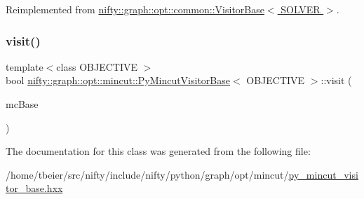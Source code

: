 Reimplemented from \hyperlink{classnifty_1_1graph_1_1opt_1_1common_1_1VisitorBase_a41efc013731cca97176a61be58db0094}{nifty\+::graph\+::opt\+::common\+::\+Visitor\+Base$<$ S\+O\+L\+V\+E\+R $>$}.

\mbox{\label{classnifty_1_1graph_1_1opt_1_1mincut_1_1PyMincutVisitorBase_a40a323a9b5748e162043d516954e940c}} 
\subsubsection{\texorpdfstring{visit()}{visit()}}
{\footnotesize\ttfamily template$<$class O\+B\+J\+E\+C\+T\+I\+VE $>$ \\
bool \hyperlink{classnifty_1_1graph_1_1opt_1_1mincut_1_1PyMincutVisitorBase}{nifty\+::graph\+::opt\+::mincut\+::\+Py\+Mincut\+Visitor\+Base}$<$ O\+B\+J\+E\+C\+T\+I\+VE $>$\+::visit (\begin{DoxyParamCaption}\item[{\hyperlink{classnifty_1_1graph_1_1opt_1_1mincut_1_1PyMincutVisitorBase_affe563abecb7aced8bf1b0a273bf61b1}{Mc\+Base} $\ast$}]{mc\+Base }\end{DoxyParamCaption})\hspace{0.3cm}{\ttfamily [inline]}}



The documentation for this class was generated from the following file\+:\begin{DoxyCompactItemize}
\item 
/home/tbeier/src/nifty/include/nifty/python/graph/opt/mincut/\hyperlink{py__mincut__visitor__base_8hxx}{py\+\_\+mincut\+\_\+visitor\+\_\+base.\+hxx}\end{DoxyCompactItemize}
